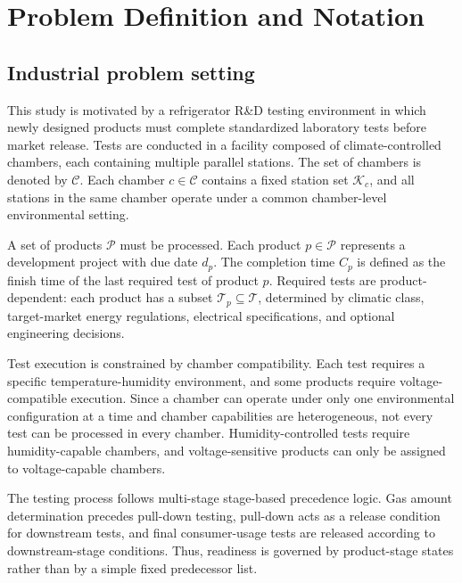 \documentclass[11pt]{article}
\begin{document}
\section{Problem Definition and Notation}
\label{sec:problem_definition}

\subsection{Industrial problem setting}
\label{subsec:industrial_problem_setting}

This study is motivated by a refrigerator R\&D testing environment in which newly designed products must complete standardized laboratory tests before market release. Tests are conducted in a facility composed of climate-controlled chambers, each containing multiple parallel stations. The set of chambers is denoted by \(\mathcal{C}\). Each chamber \(c\in\mathcal{C}\) contains a fixed station set \(\mathcal{K}_c\), and all stations in the same chamber operate under a common chamber-level environmental setting.

A set of products \(\mathcal{P}\) must be processed. Each product \(p\in\mathcal{P}\) represents a development project with due date \(d_p\). The completion time \(C_p\) is defined as the finish time of the last required test of product \(p\). Required tests are product-dependent: each product has a subset \(\mathcal{T}_p\subseteq\mathcal{T}\), determined by climatic class, target-market energy regulations, electrical specifications, and optional engineering decisions.

Test execution is constrained by chamber compatibility. Each test requires a specific temperature-humidity environment, and some products require voltage-compatible execution. Since a chamber can operate under only one environmental configuration at a time and chamber capabilities are heterogeneous, not every test can be processed in every chamber. Humidity-controlled tests require humidity-capable chambers, and voltage-sensitive products can only be assigned to voltage-capable chambers.

The testing process follows multi-stage stage-based precedence logic. Gas amount determination precedes pull-down testing, pull-down acts as a release condition for downstream tests, and final consumer-usage tests are released according to downstream-stage conditions. Thus, readiness is governed by product-stage states rather than by a simple fixed predecessor list.
\end{document}
